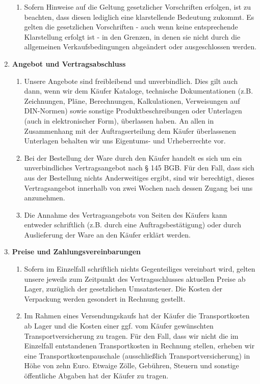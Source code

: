 \documentclass[%
    a4paper,%
    10pt,
]{scrartcl}
\begin{document}
\begin{multicols}{2}
\begin{enumerate}
\begin{enumerate}
        \item Sofern Hinweise auf die Geltung gesetzlicher Vorschriften erfolgen, ist zu beachten, dass diesen lediglich eine klarstellende Bedeutung zukommt. Es gelten die gesetzlichen Vorschriften - auch wenn keine entsprechende Klarstellung erfolgt ist - in den Grenzen, in denen sie nicht durch die allgemeinen Verkaufsbedingungen abgeändert oder ausgeschlossen werden.
      \end{enumerate}
      \item \textbf{Angebot und Vertragsabschluss}%
      \begin{enumerate}
       \item Unsere Angebote sind freibleibend und unverbindlich. Dies gilt auch dann, wenn wir dem Käufer Kataloge, technische Dokumentationen (z.B. Zeichnungen, Pläne, Berechnungen, Kalkulationen, Verweisungen auf DIN-Normen) sowie sonstige Produktbeschreibungen oder Unterlagen (auch in elektronischer Form), überlassen haben. An allen in Zusammenhang mit der Auftragserteilung dem Käufer überlassenen Unterlagen behalten wir uns Eigentums- und Urheberrechte vor.
       \item \label{ref:quotes} Bei der Bestellung der Ware durch den Käufer handelt es sich um ein unverbindliches Vertragsangebot nach § 145 BGB. Für den Fall, dass sich aus der Bestellung nichts Anderweitiges ergibt, sind wir berechtigt, dieses Vertragsangebot innerhalb von zwei Wochen nach dessen Zugang bei uns anzunehmen.
       \item Die Annahme des Vertragsangebots von Seiten des Käufers kann entweder schriftlich (z.B. durch eine Auftragsbestätigung) oder durch Auslieferung der Ware an den Käufer erklärt werden.
      \end{enumerate}
      \item \textbf{Preise und Zahlungsvereinbarungen}%
        \begin{enumerate}
         \item Sofern im Einzelfall schriftlich nichts Gegenteiliges vereinbart wird, gelten unsere jeweils zum Zeitpunkt des Vertragsschlusses aktuellen Preise ab Lager, zuzüglich der gesetzlichen Umsatzsteuer. Die Kosten der Verpackung werden gesondert in Rechnung gestellt.
         \item Im Rahmen eines Versendungskaufs hat der Käufer die Transportkosten ab Lager und die Kosten einer ggf. vom Käufer gewünschten Transportversicherung zu tragen. Für den Fall, dass wir nicht die im Einzelfall entstandenen Transportkosten in Rechnung stellen, erheben wir eine Transportkostenpauschale (ausschließlich Transportversicherung) in Höhe von zehn Euro. Etwaige Zölle, Gebühren, Steuern und sonstige öffentliche Abgaben hat der Käufer zu tragen.

\end{enumerate}
\end{enumerate}
\end{multicols}
\end{document}

